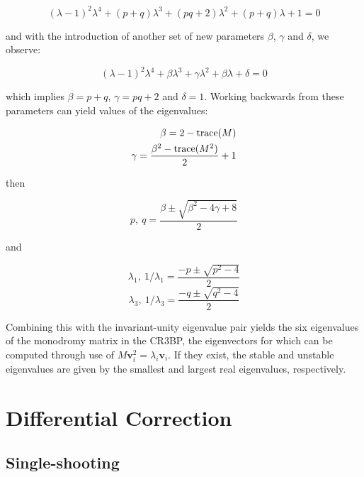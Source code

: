 \begin{equation}\label{eq:factoredpandq}
(\lambda-1)^2\lambda^4 + (p+q)\lambda^3 + (pq+2)\lambda^2 + (p+q)\lambda + 1 = 0
\end{equation}

\noindent and with the introduction of another set of new parameters $\beta$, $\gamma$ and $\delta$, we observe:

\begin{equation}
(\lambda-1)^2\lambda^4 + \beta \lambda^3 + \gamma \lambda^2 + \beta \lambda + \delta = 0
\end{equation}

\noindent which implies $\beta = p+q$, $\gamma = pq + 2$ and $\delta = 1$. Working backwards from these parameters can yield values of the eigenvalues:

\begin{align}
\beta = 2 - \textnormal{trace}(M) \\
\gamma = \frac{\beta^2 - \textnormal{trace}(M^2)}{2} + 1
\end{align}

\noindent then

\begin{equation}
p,~q = \frac{\beta \pm \sqrt{\beta^2 - 4\gamma+8}}{2}
\end{equation}

\noindent and

\begin{equation}
\lambda_1,~1/\lambda_1 = \frac{-p \pm \sqrt{p^2 - 4}}{2}
\end{equation}
\begin{equation}
\lambda_3,~1/\lambda_3 = \frac{-q \pm \sqrt{q^2 - 4}}{2}
\end{equation}

\noindent Combining this with the invariant-unity eigenvalue pair yields the six eigenvalues of the monodromy matrix in the CR3BP, the eigenvectors for which can be computed through use of $M\pmb{v}^2_i = \lambda_i\pmb{v}_i$. If they exist, the stable and unstable eigenvalues are given by the smallest and largest real eigenvalues, respectively.

\section{Differential Correction}\label{s:differentialcorrection}

\subsection{Single-shooting}\label{s:singleshooting}

